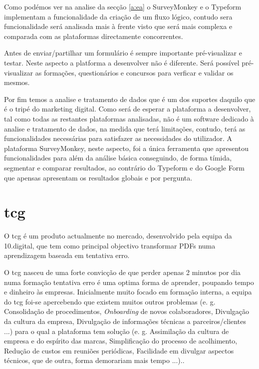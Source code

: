 Como podémos ver na analise da secção \ref{a:ea} o SurveyMonkey e o Typeform implementam a funcionalidade da criação de um fluxo lógico, contudo sera funcionalidade será analisada mais à frente visto que será mais complexa e comparada com as plataformas directamente concorrentes.

Antes de enviar/partilhar um formulário é sempre importante pré-visualizar e testar. Neste aspecto a platforma a desenvolver não é diferente. Será possível pré-visualizar as formações, questionários e concursos para verficar e validar os mesmos. 

Por fim temos a analise e tratamento de dados que é um dos suportes daquilo que é o tripé do marketing digital. Como será de esperar a plataforma a desenvolver, tal como todas as restantes plataformas analisadas, não é um software dedicado à analise e tratamento de dados, na medida que terá limitações, contudo, terá as funcionalidades necessárias para satisfazer as necessidades do utilizador. A plataforma SurveyMonkey, neste aspecto, foi a única ferramenta que apresentou funcionalidades para além da análise básica conseguindo, de forma tímida, segmentar e comparar resultados, ao contrário do Typeform e do Google Form que apensas apresentam os resultados globais e por pergunta.

\section{\acrfull{tcg}}
\label{sec:TCGM}

O \acrlong{tcg} é um produto actualmente no mercado, desenvolvido pela equipa da 10.digital, que tem como principal objectivo transformar PDFs numa aprendizagem baseada em tentativa erro.

 O \acrshort{tcg} nasceu de uma forte convicção de que perder apenas 2 minutos por dia numa formação tentativa erro é uma optima forma de aprender, poupando tempo e dinheiro às empresas. Inicialmente muito focado em formação interna, a equipa do \acrshort{tcg} foi-se apercebendo que existem muitos outros problemas (e. g. Consolidação de procedimentos, \textit{Onboarding} de novos colaboradores, Divulgação da cultura da empresa, Divulgação de informações técnicas a parceiros/clientes ...) para o qual a plataforma tem solução (e. g. Assimilação da cultura de empresa e do espírito das marcas, Simplificação do processo de acolhimento, Redução de custos em reuniões periódicas, Facilidade em divulgar aspectos técnicos, que de outra, forma demorariam mais tempo ...).\cite{tcginfo}. 
 
